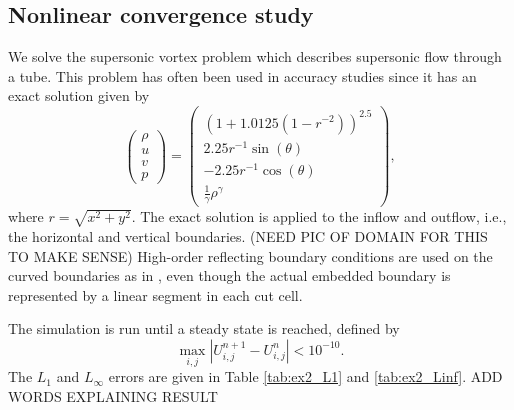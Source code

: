 \subsection{Nonlinear convergence study}
We solve the supersonic vortex problem which describes supersonic flow 
through a tube.  This problem has often been used in accuracy 
studies \cite{aftosmis:acc} since it has an exact solution given by 
$$
\begin{pmatrix}
\rho\\
u \\
v \\
p
\end{pmatrix} = \begin{pmatrix}
\left (1 + 1.0125(1-r^{-2}) \right)^{2.5}\\
2.25r^{-1}\sin(\theta)\\
-2.25r^{-1}\cos(\theta)\\
\frac{1}{\gamma}\rho^{\gamma}
\end{pmatrix},
$$
where $r = \sqrt{x^2+y^2}$.  The exact solution is applied to the inflow 
and outflow, i.e., the horizontal and vertical boundaries. (NEED PIC OF
DOMAIN FOR THIS TO MAKE SENSE)
High-order reflecting boundary conditions are used on the curved
boundaries as in \cite{}, even though  the  actual embedded boundary is
represented by a linear segment in each cut cell.  

The simulation is run until a steady state is reached, defined by 
$$
\max_{i,j}|U^{n+1}_{i,j}-U^{n}_{i,j}| < 10^{-10}.
$$
The $L_1$ and $L_\infty$ errors are given in Table \ref{tab:ex2_L1} 
and \ref{tab:ex2_Linf}. ADD WORDS EXPLAINING RESULT

